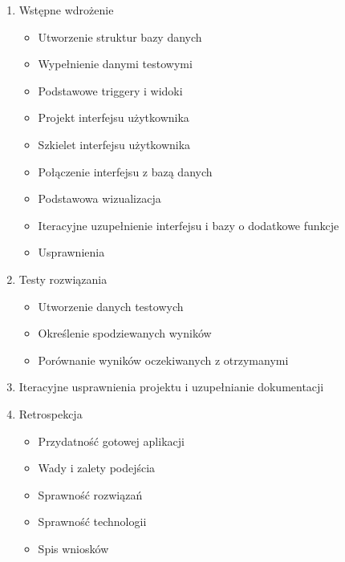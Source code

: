 \documentclass[a4paper,10pt]{report}
\begin{document}
{\begin{enumerate}
    \begin{itemize}
        \item Wspierane systemy i wersje
        \item Wybór języka
        \item Biblioteki interfejsu użytkownika
        \item Sposób przechowywania danych
        \item Instalator, aktualizacja i utrzymanie 
    \end{itemize}
    \item Wstępne wdrożenie
    \begin{itemize}
        \item Utworzenie struktur bazy danych
        \item Wypełnienie danymi testowymi
        \item Podstawowe triggery i widoki
        \item Projekt interfejsu użytkownika
        \item Szkielet interfejsu użytkownika
        \item Połączenie interfejsu z bazą danych
        \item Podstawowa wizualizacja
        \item Iteracyjne uzupełnienie interfejsu i bazy o dodatkowe funkcje
        \item Usprawnienia
    \end{itemize}
    \item Testy rozwiązania
    \begin{itemize}
        \item Utworzenie danych testowych
        \item Określenie spodziewanych wyników
        \item Porównanie wyników oczekiwanych z otrzymanymi 
    \end{itemize}
    \item Iteracyjne usprawnienia projektu i uzupełnianie dokumentacji
    \item Retrospekcja
    \begin{itemize}
        \item Przydatność gotowej aplikacji
        \item Wady i zalety podejścia
        \item Sprawność rozwiązań
        \item Sprawność technologii
        \item Spis wniosków
    \end{itemize}
\end{enumerate}
}
\end{document}
